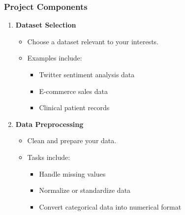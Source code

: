 \documentclass[aspectratio=169]{beamer}
\begin{document}
\begin{frame}
    \frametitle{Project Components}
    \begin{enumerate}
        \item \textbf{Dataset Selection}
            \begin{itemize}
                \item Choose a dataset relevant to your interests.
                \item Examples include:
                    \begin{itemize}
                        \item Twitter sentiment analysis data
                        \item E-commerce sales data
                        \item Clinical patient records
                    \end{itemize}
            \end{itemize}
        
        \item \textbf{Data Preprocessing}
            \begin{itemize}
                \item Clean and prepare your data.
                \item Tasks include:
                    \begin{itemize}
                        \item Handle missing values
                        \item Normalize or standardize data
                        \item Convert categorical data into numerical format
                    \end{itemize}
            \end{itemize}
    \end{enumerate}
\end{frame}
\end{document}

